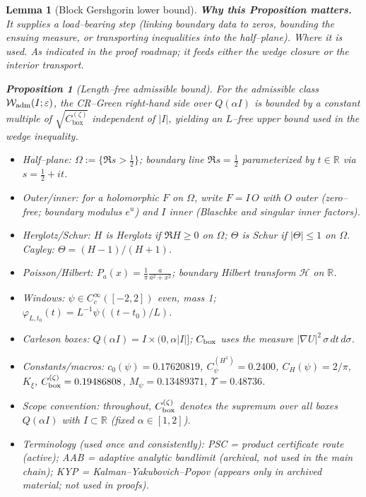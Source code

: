\documentclass[11pt]{article}
\providecommand{\czeroplateau}{0.17620819}%
\providecommand{\CboxZeta}{K_0 + K_\xi}%
\providecommand{\CHone}{2/\pi}%
\newcommand{\Hilb}{\mathcal H}
\providecommand{\CpsiHone}{0.2400}%
\providecommand{\Mpsilocked}{(4/\pi)\,\CpsiHone\,\sqrt{\CboxZeta}}
\providecommand{\UpsilonLocked}{(2/\pi)\,\Mpsilocked/\czeroplateau}%
\renewcommand{\CboxZeta}{0.19486808}
\renewcommand{\Mpsilocked}{0.13489371}
\renewcommand{\UpsilonLocked}{0.48736}
\newtheorem{proposition}{Proposition}[section]
\newtheorem{lemma}{Lemma}[section]
\theoremstyle{definition}
\theoremstyle{remark}
\newcommand{\R}{\mathbb{R}}
\providecommand{\Cbox}{C^{(\zeta)}_{\mathrm{box}}}
\begin{document}
\begin{lemma}[Block Gershgorin lower bound]
\noindent\textbf{Why this Proposition matters.} It supplies a load--bearing step (linking boundary data to zeros, bounding the ensuing measure, or transporting inequalities into the half--plane).
\noindent\textit{Where it is used.} As indicated in the proof roadmap; it feeds either the wedge closure or the interior transport.
\begin{proposition}[Length--free admissible bound]\label{prop:length-free}
For the admissible class $\mathcal W_{\rm adm}(I;\varepsilon)$, the CR--Green right-hand side over $Q(\alpha I)$ is bounded by a constant multiple of $\sqrt{\Cbox}$ independent of $|I|$, yielding an $L$--free upper bound used in the wedge inequality.
\end{proposition}
\appendix

\begin{itemize}
\item Half–plane: $\Omega:=\{\Re s>\tfrac12\}$; boundary line $\Re s=\tfrac12$ parameterized by $t\in\R$ via $s=\tfrac12+it$.
\item Outer/inner: for a holomorphic $F$ on $\Omega$, write $F=I\,O$ with $O$ outer (zero–free; boundary modulus $e^{u}$) and $I$ inner (Blaschke and singular inner factors).
\item Herglotz/Schur: $H$ is Herglotz if $\Re H\ge 0$ on $\Omega$; $\Theta$ is Schur if $|\Theta|\le 1$ on $\Omega$. Cayley: $\Theta=(H-1)/(H+1)$.
\item Poisson/Hilbert: $P_a(x)=\tfrac{1}{\pi}\tfrac{a}{a^2+x^2}$; boundary Hilbert transform $\Hilb$ on $\R$.
\item Windows: $\psi\in C_c^\infty([-2,2])$ even, mass 1; $\varphi_{L,t_0}(t)=L^{-1}\psi((t-t_0)/L)$.
\item Carleson boxes: $Q(\alpha I)=I\times(0,\alpha|I|]$; $C_{\rm box}$ uses the measure $|\nabla U|^2\,\sigma\,dt\,d\sigma$.
\item Constants/macros: $c_0(\psi)=\czeroplateau$, $C_\psi^{(H^1)}=\CpsiHone$, $C_H(\psi)=\CHone$, $K_\xi$, $C_{\rm box}^{(\zeta)}=\CboxZeta$, $M_\psi=\Mpsilocked$, $\Upsilon=\UpsilonLocked$.
\item Scope convention: throughout, $C_{\rm box}^{(\zeta)}$ denotes the supremum over all boxes $Q(\alpha I)$ with $I\subset\mathbb R$ (fixed $\alpha\in[1,2]$).
\item Terminology (used once and consistently): PSC = product certificate route (active); AAB = adaptive analytic bandlimit (archival, not used in the main chain); KYP = Kalman–Yakubovich–Popov (appears only in archived material; not used in proofs).
\end{itemize}



\end{lemma}
\end{document}
